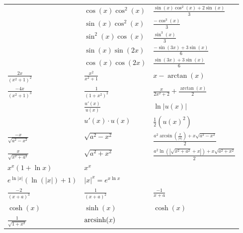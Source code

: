 \begin{tabular}{l | l | l}
                                                                      & $\cos(x) \cos^2(x)$     & $\frac{\sin(x) \cos^2(x) + 2 \sin(x)}{3}$\\
                                                                      & $\sin(x) \cos^2(x)$     & $\frac{-\cos^3(x)}{3}$\\
                                                                      & $\sin^2(x) \cos(x)$     & $\frac{\sin^3(x)}{3}$\\
                                                                      & $\sin(x) \sin(2x)$      & $\frac{-\sin(3x) + 3 \sin(x)}{6}$\\
                                                                      & $\cos(x) \cos(2x)$      & $\frac{\sin(3x) + 3 \sin(x)}{6}$\\
    $\frac{2x}{(x^2 + 1)^2}$                                          & $\frac{x^2}{x^2 + 1}$   & $x - \arctan(x)$\\
    $\frac{-4x}{(x^2 + 1)^3}$                                         & $\frac{1}{(1 + x^2)^2}$ & $\frac{x}{2x^2 + 2} + \frac{\arctan(x)}{2}$\\
                                                                      & $\frac{u'(x)}{u(x)}$    & $\ln |u(x)|$\\
                                                                      & $u'(x) \cdot u(x)$      & $\frac{1}{2}(u(x)^2)$\\
    $\frac{-x}{\sqrt{a^2 - x^2}}$                                     & $\sqrt{a^2 - x^2}$      & $\frac{a^2 \arcsin(\frac{x}{|a|})+ x \sqrt{a^2 - x^2}}{2}$\\
    $\frac{x}{\sqrt{x^2 + a^2}}$                                      & $\sqrt{a^2 + x^2}$      & $\frac{a^2 \ln(| \sqrt{x^2 + a^2} +x|) + x \sqrt{a^2 + x^2}}{2}$\\
    $x^x (1 + \ln x)$                                                 & $x^x$                   & \\
    $e^{\ln |x|}(\ln(|x|) + 1)$                                       & $|x|^x = e^{x \ln x}$   & \\
    $\frac{-2}{(x + a)^3}$                                            & $\frac{1}{(x + a)^2}$   & $\frac{-1}{x + a}$\\
    $\cosh(x)$                                                        & $\sinh(x)$              & $\cosh(x)$\\
    $\frac{1}{\sqrt{1+x^2}}$                                          & $\operatorname{arcsinh}(x)$           & \\

\end{tabular}
